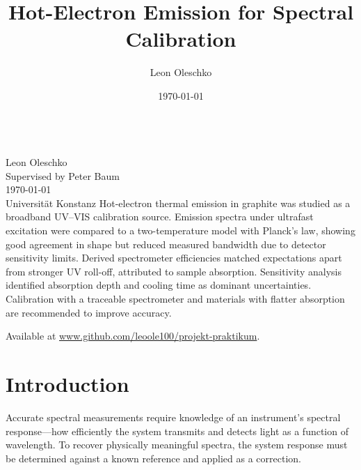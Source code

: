 \documentclass[
	parskip=half,
	a4paper,
]{scrarticle}
\begin{document}
\title{Hot-Electron Emission for Spectral Calibration}
\author{Leon Oleschko}
\date{\dotdate\today}

\begin{titlepage}
    \sffamily
    \vspace*{3cm}
    {
        \fontsize{32}{32}
    }
    \vspace{.25cm}\\
    {
        \Large
        Leon Oleschko\\
        Supervised by Peter Baum
        \vspace{.05cm}\\
        \dotdate\today\\
        Universität Konstanz
    }
    \vfill
    {
        \normalfont\normalsize
        Hot-electron thermal emission in graphite was studied as a broadband UV–VIS calibration source. Emission spectra under ultrafast excitation were compared to a two-temperature model with Planck’s law, showing good agreement in shape but reduced measured bandwidth due to detector sensitivity limits. Derived spectrometer efficiencies matched expectations apart from stronger UV roll-off, attributed to sample absorption. Sensitivity analysis identified absorption depth and cooling time as dominant uncertainties. Calibration with a traceable spectrometer and materials with flatter absorption are recommended to improve accuracy.
    }
    \vfill
    \begin{flushright}
        Available at \url{www.github.com/leoole100/projekt-praktikum}.
    \end{flushright}
\end{titlepage}


\clearpage

\section{Introduction}
Accurate spectral measurements require knowledge of an instrument’s spectral response—how efficiently the system transmits and detects light as a function of wavelength. To recover physically meaningful spectra, the system response must be determined against a known reference and applied as a correction.
\end{document}
